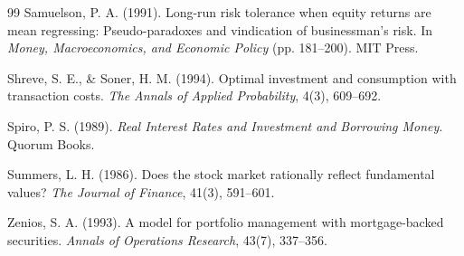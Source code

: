\documentclass[11pt,a4paper]{report}
\numberwithin{equation}{chapter}
\begin{document}
\begin{thebibliography}{99}
Samuelson, P. A. (1991).
\newblock Long-run risk tolerance when equity returns are mean regressing: Pseudo-paradoxes and vindication of businessman's risk.
\newblock In \emph{Money, Macroeconomics, and Economic Policy} (pp. 181--200). MIT Press.

Shreve, S. E., \& Soner, H. M. (1994).
\newblock Optimal investment and consumption with transaction costs.
\newblock \emph{The Annals of Applied Probability}, 4(3), 609--692.

Spiro, P. S. (1989).
\newblock \emph{Real Interest Rates and Investment and Borrowing Money}.
\newblock Quorum Books.

Summers, L. H. (1986).
\newblock Does the stock market rationally reflect fundamental values?
\newblock \emph{The Journal of Finance}, 41(3), 591--601.

Zenios, S. A. (1993).
\newblock A model for portfolio management with mortgage-backed securities.
\newblock \emph{Annals of Operations Research}, 43(7), 337--356.

\end{thebibliography}
\end{document}
